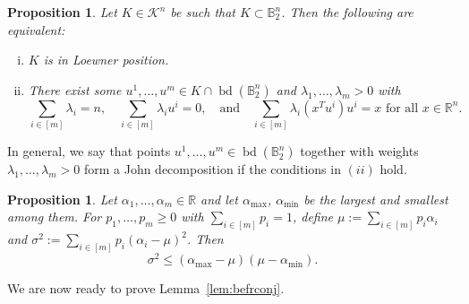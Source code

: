 \documentclass{amsart}
\newtheorem{proposition}[theorem]{Proposition}
\newcommand\R{\mathbb{R}}
\newcommand\B{\mathbb{B}}
\newcommand\CK{\mathcal{K}}
\DeclareMathOperator{\bd}{bd}
\begin{document}
\begin{proposition}\label{prop:lownertheorem}
Let $K \in \CK^n$ be such that $K \subset \B_2^n$.
Then the following are equivalent:
\begin{enumerate}[(i)]
\item $K$ is in Loewner position.
\item There exist some $u^1, \dots, u^m \in K \cap \bd(\B_2^n)$ and $\lambda_1, \dots, \lambda_m > 0$ with
\[
    \sum_{i \in [m]} \lambda_i = n,
        \quad
    \sum_{i \in [m]} \lambda_i u^i = 0,
        \quad \text{and} \quad
    \sum_{i \in [m]} \lambda_i (x^T u^i) u^i = x \text{ for all } x \in \R^n.
\]
\end{enumerate}
\end{proposition}



In general, we say that points $u^1,\dots,u^m \in \bd(\B_2^n)$ together with weights $\lambda_1, \dots, \lambda_m > 0$ form a John decomposition if the conditions in $(ii)$ hold.



\begin{proposition} \label{prop:befr}
Let $\alpha_1, \dots, \alpha_m \in \R$ and let $\alpha_{\max}$, $\alpha_{\min}$ be the largest and smallest among them.
For $p_1, \dots, p_m \geq 0$ with $\sum_{i \in [m]} p_i = 1$,
define $\mu := \sum_{i \in [m]} p_i \alpha_i$ and $\sigma^2 := \sum_{i \in [m]} p_i (\alpha_i - \mu)^2$.
Then
\[
	\sigma^2
	\leq (\alpha_{\max} - \mu) (\mu - \alpha_{\min}).
\]
\end{proposition}



We are now ready to prove Lemma~\ref{lem:befrconj}.
\end{document}
